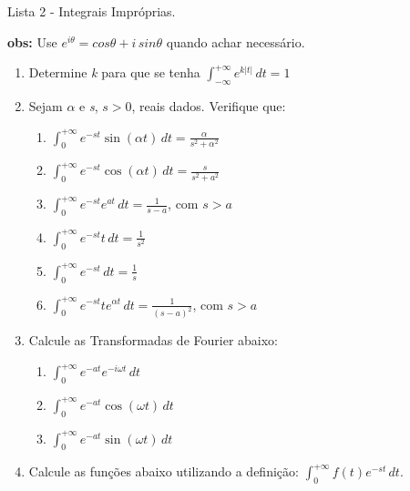 \documentclass[11pt,a4paper]{article}
\newcommand{\integral}{\displaystyle\int}
\begin{document}
	\begin{center}
		\Large Lista 2 - Integrais Impróprias.
	\end{center}

\textbf{obs:} Use $e^{i\theta} = cos\theta + i \, sin\theta$ quando achar necessário.

	\begin{enumerate}
	
		\item Determine \textit{k} para que se tenha $\integral_{-\infty}^{+\infty} e^{k|t|} \, dt = 1$
		
		\item Sejam \textit{$\alpha$} e \textit{s}, \textit{$s > 0$}, reais dados. Verifique que:
		
		\begin{enumerate}		
		\item $\integral_0^{+\infty} e^{-st} \sin (\alpha t)  \, dt = \frac{\alpha}{s^2 + \alpha^2}$
		\item $\integral_0^{+\infty} e^{-st} \cos (\alpha t)  \, dt = \frac{s}{s^2 + a^2}$
		\item $\integral_0^{+\infty} e^{-st} e^{at} \, dt = \frac{1}{s - a}$, com $s > a$
		\item $\integral_0^{+\infty} e^{-st} t \, dt = \frac{1}{s^2}$
		\item $\integral_0^{+\infty} e^{-st} \, dt = \frac{1}{s}$
		\item $\integral_0^{+\infty} e^{-st} te^{\alpha t} \, dt = \frac{1}{(s - a)^2}$, com $s > a$
		\end{enumerate}
		
		\item Calcule as Transformadas de Fourier abaixo:	
		
		\begin{enumerate}		
		\item $\integral_0^{+\infty} e^{-at} e^{-i \omega t}  \, dt$
		\item $\integral_0^{+\infty} e^{-at} \cos (\omega t)  \, dt$
		\item $\integral_0^{+\infty} e^{-at} \sin (\omega t)  \, dt$
		\end{enumerate}		
		
		\item Calcule as funções abaixo utilizando a definição: $\integral_0^{+\infty} f(t) e^{-st} \, dt$.
		

\end{enumerate}
\end{document}
